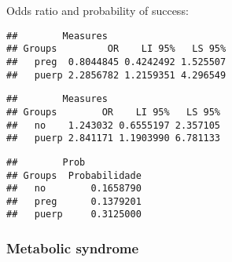 \documentclass[
]{article}
\newenvironment{Shaded}{\begin{snugshade}}{\end{snugshade}}
\newcommand{\CommentTok}[1]{\textcolor[rgb]{0.56,0.35,0.01}{\textit{#1}}}
\newcommand{\KeywordTok}[1]{\textcolor[rgb]{0.13,0.29,0.53}{\textbf{#1}}}
\newcommand{\NormalTok}[1]{#1}
\newcommand{\OperatorTok}[1]{\textcolor[rgb]{0.81,0.36,0.00}{\textbf{#1}}}
\newcommand{\StringTok}[1]{\textcolor[rgb]{0.31,0.60,0.02}{#1}}
\begin{document}
Odds ratio and probability of success:

\begin{Shaded}
\end{Shaded}

\begin{verbatim}
##        Measures
## Groups         OR    LI 95%   LS 95%
##   preg  0.8044845 0.4242492 1.525507
##   puerp 2.2856782 1.2159351 4.296549
\end{verbatim}

\begin{Shaded}
\end{Shaded}

\begin{verbatim}
##        Measures
## Groups        OR    LI 95%   LS 95%
##   no    1.243032 0.6555197 2.357105
##   puerp 2.841171 1.1903990 6.781133
\end{verbatim}

\begin{Shaded}
\end{Shaded}

\begin{verbatim}
##        Prob
## Groups  Probabilidade
##   no        0.1658790
##   preg      0.1379201
##   puerp     0.3125000
\end{verbatim}

\hypertarget{metabolic-syndrome-1}{%
\subsubsection{Metabolic syndrome}\label{metabolic-syndrome-1}}

\begin{Shaded}
\end{Shaded}
\end{document}
